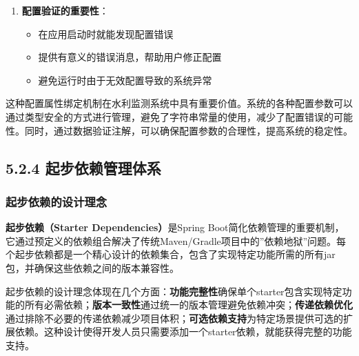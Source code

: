 \begin{enumerate}
  \begin{itemize}
  \tightlist
  \item
    每个配置项都提供了合理的默认值
  \item
    确保即使用户不提供配置，系统也能正常运行
  \item
    默认值应该是生产环境可接受的安全值
  \end{itemize}
\item
  \textbf{配置验证的重要性}：

  \begin{itemize}
  \tightlist
  \item
    在应用启动时就能发现配置错误
  \item
    提供有意义的错误消息，帮助用户修正配置
  \item
    避免运行时由于无效配置导致的系统异常
  \end{itemize}
\end{enumerate}

这种配置属性绑定机制在水利监测系统中具有重要价值。系统的各种配置参数可以通过类型安全的方式进行管理，避免了字符串常量的使用，减少了配置错误的可能性。同时，通过数据验证注解，可以确保配置参数的合理性，提高系统的稳定性。

\subsection{5.2.4 起步依赖管理体系}\label{ux8d77ux6b65ux4f9dux8d56ux7ba1ux7406ux4f53ux7cfb}

\subsubsection{起步依赖的设计理念}\label{ux8d77ux6b65ux4f9dux8d56ux7684ux8bbeux8ba1ux7406ux5ff5}

\textbf{起步依赖（Starter Dependencies）}是Spring Boot简化依赖管理的重要机制，它通过预定义的依赖组合解决了传统Maven/Gradle项目中的''依赖地狱''问题。每个起步依赖都是一个精心设计的依赖集合，包含了实现特定功能所需的所有jar包，并确保这些依赖之间的版本兼容性。

起步依赖的设计理念体现在几个方面：\textbf{功能完整性}确保单个starter包含实现特定功能的所有必需依赖；\textbf{版本一致性}通过统一的版本管理避免依赖冲突；\textbf{传递依赖优化}通过排除不必要的传递依赖减少项目体积；\textbf{可选依赖支持}为特定场景提供可选的扩展依赖。这种设计使得开发人员只需要添加一个starter依赖，就能获得完整的功能支持。

